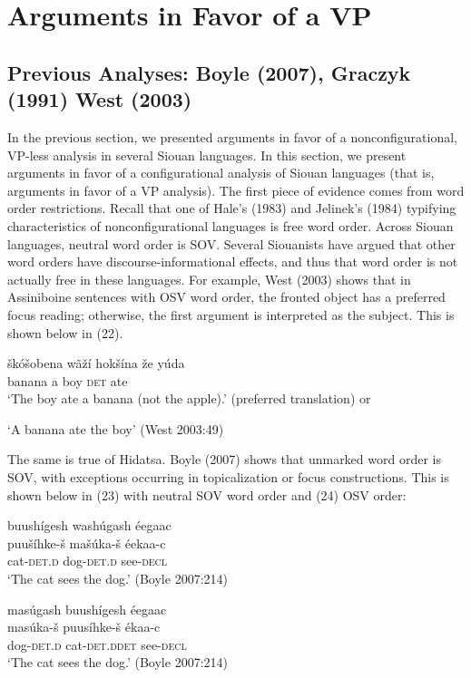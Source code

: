 \documentclass[output=paper]{LSP/langsci}
\begin{document}
\section{Arguments in Favor of a VP}

\subsection{Previous Analyses: Boyle (2007), Graczyk (1991) West (2003)}

In the previous section, we presented arguments in favor of a nonconfigurational, VP-less analysis in several Siouan languages.  In this section, we present arguments in favor of a configurational analysis of Siouan languages (that is, arguments in favor of a VP analysis).  The first piece of evidence comes from word order restrictions. Recall that one of Hale's (1983) and Jelinek's (1984) typifying characteristics of nonconfigurational languages is free word order.  Across Siouan languages, neutral word order is SOV.  Several Siouanists have argued that other word orders have discourse-informational effects, and thus that word order is not actually free in these languages. For example, West (2003) shows that in Assiniboine sentences with OSV word order, the fronted object has a preferred focus reading; otherwise, the first argument is interpreted as the subject. This is shown below in (22). 

\begin{exe}
\ex	\gll  \v{s}k\'o\v{s}obena w\~a\v{z}\'i 	hok\v{s}\'ina 	\v{z}e 		y\'uda \\
banana 		a 			boy 	\textsc{det} 	ate \\
\trans `The boy ate a banana (not the apple).' (preferred translation) or 

`A banana ate the boy'  (West 2003:49) 
\end{exe}

The same is true of Hidatsa.  Boyle (2007) shows that unmarked word order is SOV, with exceptions occurring in topicalization or focus constructions.  This is shown below in (23) with neutral SOV word order and (24) OSV order:
\pagebreak
\begin{exe}
\ex 
\glll buush\'igesh wash\'ugash \'eegaac\\
puu\v{s}\'ihke-\v{s}  ma\v{s}\'uka-\v{s} \'eekaa-c \\
cat-\textsc{det.d} dog-\textsc{det.d} see-\textsc{decl}  \\
\trans `The cat sees the dog.'  (Boyle 2007:214)

\ex 
\glll mas\'ugash 		buush\'igesh 	\'eegaac\\
mas\'uka-\v{s} 		puus\'ihke-\v{s} 	\'ekaa-c \\
dog-\textsc{det.d} 		cat-\textsc{det.d}\textsc{det}	see-\textsc{decl} \\
\trans `The cat sees the dog.' (Boyle 2007:214)

\end{exe}
	
\end{document}
